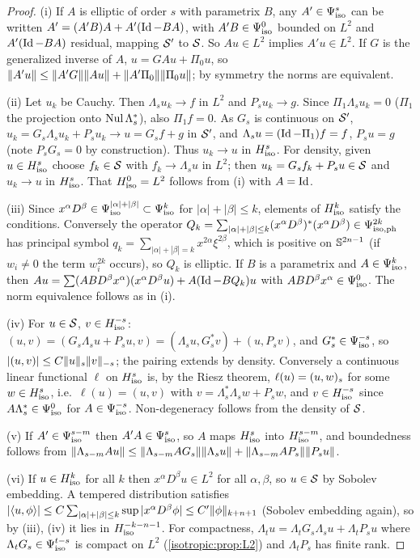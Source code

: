 \begin{proof}
(i) If $A$ is elliptic of order $s$ with parametrix $B$, any $A'\in\Psi^{s}_{\mathrm{iso}}$
can be written $A'=(A'B)A+A'(\operatorname{Id}-BA)$, with $A'B\in\Psi^{0}_{\mathrm{iso}}$ bounded on $L^2$
and $A'(\operatorname{Id}-BA)$ residual, mapping $\mathcal{S}'$ to $\mathcal{S}$. So $Au\in L^2$ implies
$A'u\in L^2$. If $G$ is the generalized inverse of $A$,
$u=GAu+\Pi_0u$, so $\lVert A'u\rVert\le\lVert A'G\rVert\lVert Au\rVert+\lVert A'\Pi_0\rVert\lVert \Pi_0u\rVert$; by
symmetry the norms are equivalent.

(ii) Let $u_k$ be Cauchy. Then $\Lambda_su_k\to f$ in $L^2$ and $P_su_k\to g$.
Since $\Pi_1\Lambda_su_k=0$ ($\Pi_1$ the projection onto $\operatorname{Nul}\Lambda_s^*$), also
$\Pi_1f=0$. As $G_s$ is continuous on $\mathcal{S}'$, $u_k=G_s\Lambda_su_k+P_su_k\to u=G_sf+g$
in $\mathcal{S}'$, and $\Lambda_su=(\operatorname{Id}-\Pi_1)f=f$, $P_su=g$ (note $P_sG_s=0$ by
construction). Thus $u_k\to u$ in $H^{s}_{\mathrm{iso}}$. For density, given
$u\in H^{s}_{\mathrm{iso}}$ choose $f_k\in\mathcal{S}$ with $f_k\to\Lambda_su$ in $L^2$; then
$u_k=G_sf_k+P_su\in\mathcal{S}$ and $u_k\to u$ in $H^{s}_{\mathrm{iso}}$. That $H^{0}_{\mathrm{iso}}=L^2$
follows from (i) with $A=\operatorname{Id}$.

(iii) Since $x^\alpha D^\beta\in\Psi^{|\alpha|+|\beta|}_{\mathrm{iso}}\subset\Psi^{k}_{\mathrm{iso}}$ for
$|\alpha|+|\beta|\le k$, elements of $H^{k}_{\mathrm{iso}}$ satisfy the conditions.
Conversely the operator
$Q_k=\sum_{|\alpha|+|\beta|\le k}(x^\alpha D^\beta)^*(x^\alpha D^\beta)\in\Psi^{2k}_{\mathrm{iso,ph}}$
has principal symbol $q_k=\sum_{|\alpha|+|\beta|=k}x^{2\alpha}\xi^{2\beta}$, which is
positive on $\mathbb{S}^{2n-1}$ (if $w_i\ne0$ the term $w_i^{2k}$ occurs), so $Q_k$
is elliptic. If $B$ is a parametrix and $A\in\Psi^{k}_{\mathrm{iso}}$, then
$Au=\sum(ABD^\beta x^\alpha)(x^\alpha D^\beta u)+A(\operatorname{Id}-BQ_k)u$ with
$ABD^\beta x^\alpha\in\Psi^{0}_{\mathrm{iso}}$. The norm equivalence follows as in (i).

(iv) For $u\in\mathcal{S}$, $v\in H^{-s}_{\mathrm{iso}}$:
$(u,v)=(G_s\Lambda_su+P_su,v)=(\Lambda_su,G_s^*v)+(u,P_sv)$, and $G_s^*\in\Psi^{-s}_{\mathrm{iso}}$,
so $|(u,v)|\le C\lVert u\rVert_s\lVert v\rVert_{-s}$; the pairing extends by density.
Conversely a continuous linear functional $\ell$ on $H^{s}_{\mathrm{iso}}$ is, by the
Riesz theorem, $\ell(u)=( u, w)_s$ for some $w\in H^{s}_{\mathrm{iso}}$, i.e.\
$\ell(u)=(u,v)$ with $v=\Lambda_s^*\Lambda_sw+P_sw$, and $v\in H^{-s}_{\mathrm{iso}}$
since $A\Lambda_s^*\in\Psi^{0}_{\mathrm{iso}}$ for $A\in\Psi^{-s}_{\mathrm{iso}}$. Non-degeneracy follows
from the density of $\mathcal{S}$.

(v) If $A'\in\Psi^{s-m}_{\mathrm{iso}}$ then $A'A\in\Psi^{s}_{\mathrm{iso}}$, so $A$ maps $H^{s}_{\mathrm{iso}}$ into
$H^{s-m}_{\mathrm{iso}}$, and boundedness follows from
$\lVert \Lambda_{s-m}Au\rVert\le\lVert \Lambda_{s-m}AG_s\rVert\lVert \Lambda_su\rVert+\lVert \Lambda_{s-m}AP_s\rVert\lVert P_su\rVert$.

(vi) If $u\in H^{k}_{\mathrm{iso}}$ for all $k$ then $x^\alpha D^\beta u\in L^2$ for all
$\alpha,\beta$, so $u\in\mathcal{S}$ by Sobolev embedding. A tempered distribution
satisfies
$|\langle u, \phi\rangle|\le C\sum_{|\alpha|+|\beta|\le k}\sup|x^\alpha D^\beta\phi|\le C'\lVert \phi\rVert_{k+n+1}$
(Sobolev embedding again), so by (iii), (iv) it lies in $H^{-k-n-1}_{\mathrm{iso}}$. For
compactness, $\Lambda_tu=\Lambda_tG_s\Lambda_su+\Lambda_tP_su$ where
$\Lambda_tG_s\in\Psi^{t-s}_{\mathrm{iso}}$ is compact on $L^2$ (\cref{isotropic:prop:L2}) and
$\Lambda_tP_s$ has finite rank.
\end{proof}

